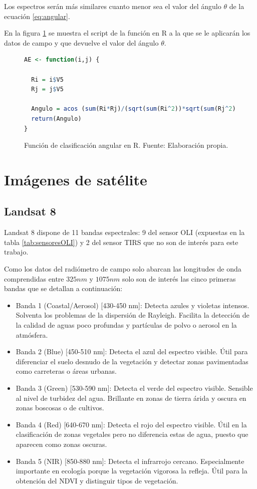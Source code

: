 Los espectros serán más similares cuanto menor sea el valor del ángulo $\theta$ de la ecuación \ref{eq:angular}.\Sep

En la figura \ref{fig:AE} se muestra el script de la función en R a la que se le aplicarán los datos de campo y que devuelve el valor del ángulo $\theta$.

\begin{figure}
\centering
\begin{lstlisting}[language = R, frame = single]
AE <- function(i,j) {
  
  Ri = i$V5
  Rj = j$V5

  Angulo = acos (sum(Ri*Rj)/(sqrt(sum(Ri^2))*sqrt(sum(Rj^2))))
  return(Angulo)
}
\end{lstlisting}
\caption[Función clasificación angular]{Función de clasificación angular en R. Fuente: Elaboración propia.}
\label{fig:AE}
\end{figure}

\section{Imágenes de satélite}
\subsection{Landsat 8}
Landsat 8 dispone de 11 bandas espectrales: 9 del sensor \ac{OLI} (expuestas en la tabla \ref{tab:sensoresOLI}) y 2 del sensor \ac{TIRS} que no son de interés para este trabajo.\Sep

Como los datos del radiómetro de campo solo abarcan las longitudes de onda comprendidas entre $325 nm$ y $1075 nm$ solo son de interés las cinco primeras bandas que se detallan a continuación:

\begin{itemize}
	\item Banda 1 (Coastal/Aerosol) [430-450 nm]: Detecta azules y violetas intensos. Solventa los problemas de la dispersión de Rayleigh. Facilita la detección de la calidad de aguas poco profundas y partículas de polvo o aerosol en la atmósfera.
	\item Banda 2 (Blue) [450-510 nm]: Detecta el azul del espectro visible. Útil para diferenciar el suelo desnudo de la vegetación y detectar zonas pavimentadas como carreteras o áreas urbanas.
	\item Banda 3 (Green) [530-590 nm]: Detecta el verde del espectro visible. Sensible al nivel de turbidez del agua. Brillante en zonas de tierra árida y oscura en zonas boscosas o de cultivos.
	\item Banda 4 (Red) [640-670 nm]: Detecta el rojo del espectro visible. Útil en la clasificación de zonas vegetales pero no diferencia estas de agua, puesto que aparecen como zonas oscuras.
	\item Banda 5 (NIR) [850-880 nm]: Detecta el infrarrojo cercano. Especialmente importante en ecología porque la vegetación vigorosa la refleja. Útil para la obtención del \ac{NDVI} y distinguir tipos de vegetación.
\end{itemize}


